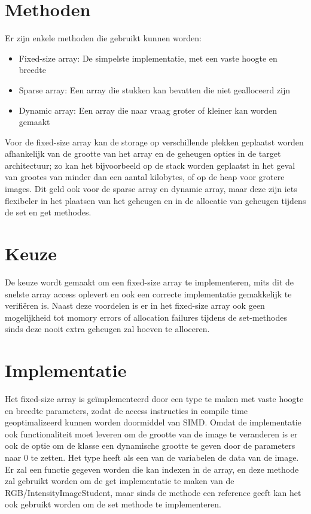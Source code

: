 \documentclass[11pt]{article}
\begin{document}
    \section{Methoden}\label{sec:methoden}
    Er zijn enkele methoden die gebruikt kunnen worden:
    \begin{itemize}
        \item Fixed-size array: De simpelste implementatie, met een vaste hoogte en breedte
        \item Sparse array: Een array die stukken kan bevatten die niet gealloceerd zijn
        \item Dynamic array: Een array die naar vraag groter of kleiner kan worden gemaakt
    \end{itemize}
    Voor de fixed-size array kan de storage op verschillende plekken geplaatst worden afhankelijk
    van de grootte van het array en de geheugen opties in de target architectuur;
    zo kan het bijvoorbeeld op de stack worden geplaatst in het geval van grootes van minder dan
    een aantal kilobytes, of op de heap voor grotere images.
    Dit geld ook voor de sparse array en dynamic array, maar deze zijn iets flexibeler in het
    plaatsen van het geheugen en in de allocatie van geheugen tijdens de set en get methodes.


    \section{Keuze}\label{sec:keuze}
    De keuze wordt gemaakt om een fixed-size array te implementeren, mits dit de snelste array
    access oplevert en ook een correcte implementatie gemakkelijk te verifiëren is.
    Naast deze voordelen is er in het fixed-size array ook geen mogelijkheid tot momory errors of
    allocation failures tijdens de set-methodes sinds deze nooit extra geheugen zal hoeven te
    alloceren.


    \section{Implementatie}\label{sec:implementatie}
    Het fixed-size array is geïmplementeerd door een type te maken met vaste hoogte en breedte
    parameters, zodat de access instructies in compile time geoptimalizeerd kunnen worden
    doormiddel van SIMD. Omdat de implementatie ook functionaliteit moet leveren om de grootte
    van de image te veranderen is er ook de optie om de klasse een dynamische grootte te geven
    door de parameters naar 0 te zetten.
    Het type heeft als een van de variabelen de data van de image.
    Er zal een functie gegeven worden die kan indexen in de array, en deze methode zal gebruikt
    worden om de get implementatie te maken van de RGB/IntensityImageStudent, maar sinds de
    methode een reference geeft kan het ook gebruikt worden om de set methode te implementeren.
\end{document}

